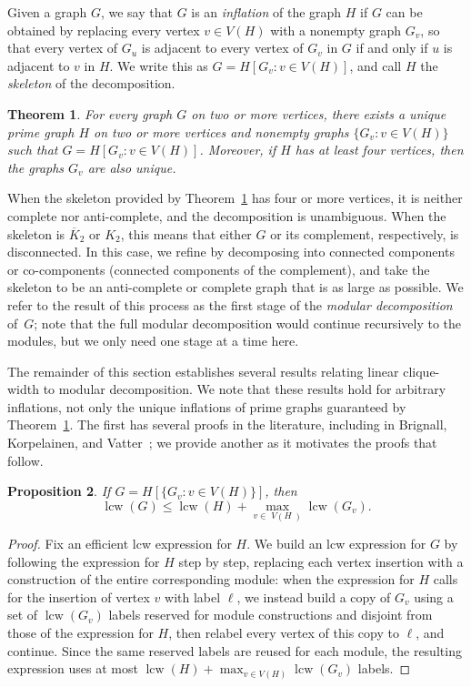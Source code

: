 \documentclass[10pt]{article}
\newcommand{\lcw}{\operatorname{lcw}}
\newcommand{\VH}{\;\!\!V\!(\!H\;\!\!)\!}
\theoremstyle{plain}
\newtheorem{theorem}{Theorem}[section]
\newtheorem{proposition}[theorem]{Proposition}
\begin{document}
Given a graph $G$, we say that $G$ is an \emph{inflation} of the graph $H$ if $G$ can be obtained by replacing every vertex $v \in V(H)$ with a nonempty graph $G_v$, so that every vertex of $G_u$ is adjacent to every vertex of $G_v$ in $G$ if and only if $u$ is adjacent to $v$ in $H$. We write this as $G = H[G_v : v \in V(H)]$, and call $H$ the \emph{skeleton} of the decomposition.

\begin{theorem}
\label{thm:mod:decomp}
For every graph $G$ on two or more vertices, there exists a unique prime graph $H$ on two or more vertices and nonempty graphs $\{G_v : v\in V(H)\}$ such that $G = H[G_v : v \in V(H)]$. Moreover, if $H$ has at least four vertices, then the graphs $G_v$ are also unique.
\end{theorem}

When the skeleton provided by Theorem~\ref{thm:mod:decomp} has four or more vertices, it is neither complete nor anti-complete, and the decomposition is unambiguous. When the skeleton is $\overline{K}_2$ or $K_2$, this means that either $G$ or its complement, respectively, is disconnected. In this case, we refine by decomposing into connected components or co-components (connected components of the complement), and take the skeleton to be an anti-complete or complete graph that is as large as possible. We refer to the result of this process as the first stage of the \emph{modular decomposition} of~$G$; note that the full modular decomposition would continue recursively to the modules, but we only need one stage at a time here.

The remainder of this section establishes several results relating linear clique-width to modular decomposition. We note that these results hold for arbitrary inflations, not only the unique inflations of prime graphs guaranteed by Theorem~\ref{thm:mod:decomp}. The first has several proofs in the literature, including in Brignall, Korpelainen, and Vatter~{\cite[Proposition 3.1]{brignall:linear-clique-w:}}; we provide another as it motivates the proofs that follow.

\begin{proposition}
\label{prop:lcw:inflation}
If $G=H[\{G_v : v\in V(H)\}]$, then
\[
	\lcw(G)
	\le
	\lcw(H) + \max_{v\in \VH} \lcw(G_v).
\]
\end{proposition}
\begin{proof}
Fix an efficient lcw expression for $H$. We build an lcw expression for $G$ by following the expression for $H$ step by step, replacing each vertex insertion with a construction of the entire corresponding module: when the expression for $H$ calls for the insertion of vertex $v$ with label $\ell$, we instead build a copy of $G_v$ using a set of $\lcw(G_v)$ labels reserved for module constructions and disjoint from those of the expression for $H$, then relabel every vertex of this copy to $\ell$, and continue. Since the same reserved labels are reused for each module, the resulting expression uses at most $\lcw(H)+\max_{v\in V(H)}\lcw(G_v)$ labels.
\end{proof}
\end{document}
